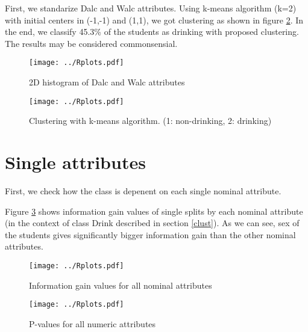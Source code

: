 \documentclass[a4paper]{article}
\begin{document}
First, we standarize Dalc and Walc attributes.
Using k-means algorithm (k=2) with initial centers in (-1,-1) and (1,1), we got clustering as shown in figure \ref{fig:clust}.
In the end, we classify 45.3\% of the students as drinking with proposed clustering.
The results may be considered commonsensial.



\begin{figure}[!hbt]
    \centering
    \texttt{[image: ../Rplots.pdf]}
    \label{fig:hist2D}
    \caption[]{2D histogram of Dalc and Walc attributes}
\end{figure}

\begin{figure}[!hbt]
    \centering
    \texttt{[image: ../Rplots.pdf]}
    \label{fig:clust}
    \caption[]{Clustering with k-means algorithm. (1: non-drinking, 2: drinking)}
\end{figure}

\section{Single attributes}
\label{xent}
First, we check how the class is depenent on each single nominal attribute.

Figure \ref{fig:nominalIG} shows information gain values
of single splits by each nominal attribute (in the context of class Drink described in section \ref{clust}).
As we can see, sex of the students gives significantly bigger information gain
than the other nominal attributes.

% 

\begin{figure}[!hbt]
    \centering
    \texttt{[image: ../Rplots.pdf]}
    \caption[]{Information gain values for all nominal attributes
    \label{fig:nominalIG}
    }
\end{figure}

\begin{figure}[!hbt]
    \centering
    \texttt{[image: ../Rplots.pdf]}
    \caption[]{P-values for all numeric attributes
    \label{fig:pval}
    }
\end{figure}
\end{document}
